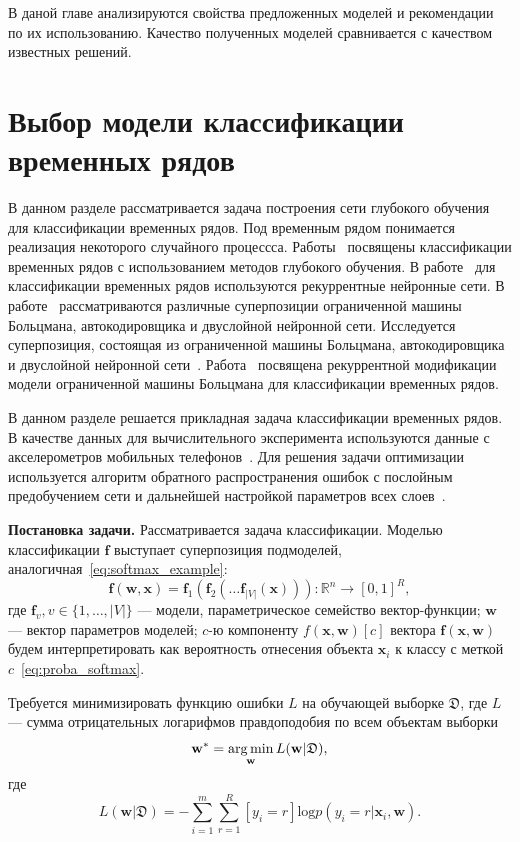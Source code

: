 В даной главе анализируются свойства предложенных моделей и рекомендации по их использованию. Качество полученных моделей сравнивается с качеством
известных решений.
\section{Выбор модели классификации временных рядов}

В данном разделе рассматривается задача построения сети глубокого обучения для классификации временных рядов. Под временным рядом понимается реализация некоторого случайного процессса.  Работы~\cite{ts1,ts2,ts3} посвящены классификации временных рядов с использованием методов глубокого обучения. В работе~\cite{ts2}  для классификации временных рядов  используются рекуррентные нейронные сети. В работе~\cite{ts3} рассматриваются различные суперпозиции ограниченной машины Больцмана, автокодировщика и двуслойной нейронной сети. Исследуется суперпозиция, состоящая из ограниченной машины Больцмана, автокодировщика и двуслойной нейронной сети~\cite{founds}. Работа~\cite{recrbm} посвящена рекуррентной модификации модели ограниченной машины Больцмана для классификации временных рядов. 

В данном разделе решается прикладная задача классификации временных рядов. В качестве данных для вычислительного эксперимента используются данные с акселерометров мобильных телефонов~\cite{wisdm}. Для решения задачи оптимизации используется алгоритм обратного распространения ошибок с послойным предобучением сети и дальнейшей настройкой параметров всех слоев~\cite{finetuning}.

\textbf{Постановка задачи. }
Рассматривается задача классификации. 
Моделью классификации  $\mathbf{f}$ выступает суперпозиция подмоделей, аналогичная~\eqref{eq:softmax_example}:
\begin{equation}
\label{eq:wisdm_superposition}
 \mathbf{f}(\mathbf{w}, \mathbf{x}) = \mathbf{f}_1(\mathbf{f}_2(\dots \mathbf{f}_{|V|}(\mathbf{x}))): \mathbb{R}^n \to [0,1]^R,
\end{equation}
где $\mathbf{f}_v, v \in \{1,\dots,{|V|}\}$ --- модели, параметрическое семейство вектор-функции; $\mathbf{w}$ --- вектор параметров моделей;
$c$-ю компоненту $f(\mathbf{x}, \mathbf{w})[c]$ вектора $\mathbf{f}(\mathbf{x},\mathbf{w})$ будем интерпретировать как вероятность отнесения объекта $\mathbf{x}_i$ к классу с меткой $c$~\eqref{eq:proba_softmax}.

Требуется минимизировать функцию ошибки $L$ на обучающей выборке $\mathfrak{D}$,
где $L$ --- сумма отрицательных логарифмов правдоподобия по всем объектам выборки
\[
\mathbf{w}^{*} = \operatorname*{arg\,min}_\mathbf{w} L(\mathbf{w}|\mathfrak{D}),
\]
где
\[
 L(\mathbf{w}|\mathfrak{D}) = -\sum_{i=1}^m \sum_{r=1}^R [y_i = r] \text{log} p(y_i=r|\mathbf{x}_i,\mathbf{w}).
\]

